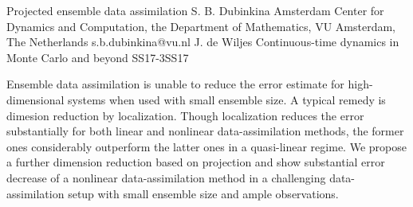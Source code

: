 \begin{talk}
  {Projected ensemble data assimilation}%
  {S. B. Dubinkina }%
  {Amsterdam Center for Dynamics and Computation, the Department of Mathematics, VU Amsterdam, The Netherlands}%
  {s.b.dubinkina@vu.nl}%
  {J. de Wiljes}%
{Continuous-time dynamics in Monte Carlo and beyond}
{}{SS17-3}{SS17}

			
Ensemble data assimilation is unable to reduce the error estimate for high-dimensional systems when used with small ensemble size. A typical remedy is dimesion reduction by localization. Though localization reduces the error substantially for both linear and nonlinear data-assimilation methods, the former ones considerably outperform the latter ones in a quasi-linear regime. We propose a further dimension reduction based on projection and show substantial error decrease of a nonlinear data-assimilation method in a challenging data-assimilation setup with small ensemble size and ample observations.  

\medskip

\end{talk}

